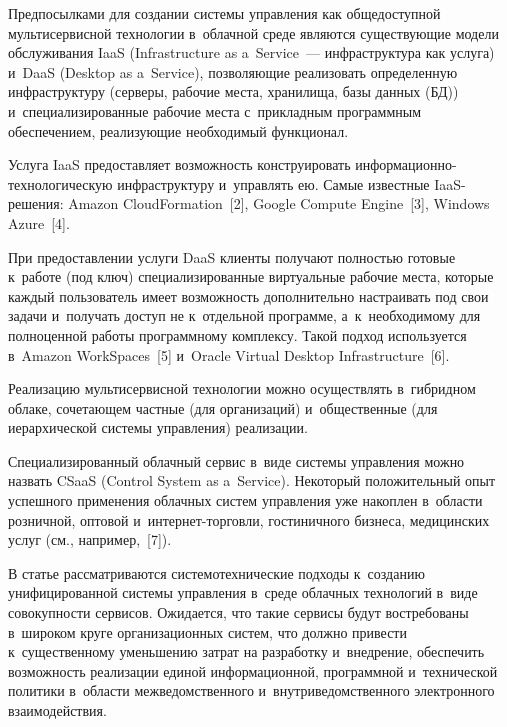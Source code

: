 \begin{multicols}{2}
    Предпосылками для создании системы управ\-ле\-ния как общедоступной 
мультисервисной технологии в~облачной среде являются существующие 
модели обслуживания IaaS (Infrastructure as a~Service~---
инфраструктура как услуга)
и~DaaS (Desktop as 
a~Service), позволяющие реализовать  определенную 
инфраструктуру (серверы, рабочие места, хранилища, базы данных (БД)) 
и~специализированные рабочие места с~прикладным программным 
обеспечением, реализующие необходимый функционал. 

Услуга IaaS пред\-остав\-ля\-ет 
возможность конструировать ин\-фор\-ма\-ци\-он\-но-тех\-но\-ло\-ги\-че\-скую 
ин\-фра\-струк\-ту\-ру и~управ\-лять ею. 
Самые известные IaaS-решения: Amazon CloudFormation~[2], Google Compute 
Engine~[3], Windows Azure~[4]. 

При предоставлении услуги DaaS 
клиенты получают полностью готовые к~работе (под ключ) 
специализированные виртуальные рабочие места, которые каждый 
пользователь имеет возможность дополнительно настраивать под свои задачи 
и~получать доступ не к~отдельной программе, а~к~необходимому для 
полноценной работы программному комплексу. Такой подход используется 
в~Amazon WorkSpaces~[5] и~Oracle Virtual Desktop Infrastructure~[6].
    
    Реализацию мультисервисной технологии можно осуществлять 
в~гибридном облаке, со\-че\-та\-ющем частные (для организаций) 
и~общественные (для иерархической сис\-те\-мы управ\-ле\-ния) реализации.
{ %

}
    
    Специализированный облачный сервис в~виде системы управления 
можно назвать CSaaS (Control System as a~Service). Некоторый 
положительный опыт успешного применения облачных сис\-тем управ\-ле\-ния 
уже накоплен в~об\-ласти розничной, оптовой  
и~ин\-тер\-нет-тор\-гов\-ли, гостиничного бизнеса, медицинских услуг 
(см., например,~[7]).
    
    В статье рассматриваются системотехнические подходы к~созданию 
унифицированной системы управления в~среде облачных технологий в~виде\linebreak 
совокупности сервисов. Ожидается, что такие сервисы будут  востребованы 
в~широком круге организационных систем, что должно привести  
к~существенному уменьшению затрат на разработку и~внедрение, обеспечить 
возможность реализации единой информационной, программной 
и~технической политики в~об\-ласти межведомственного 
и~внутриведомственного электронного взаимодействия.
{

}




\end{multicols}
